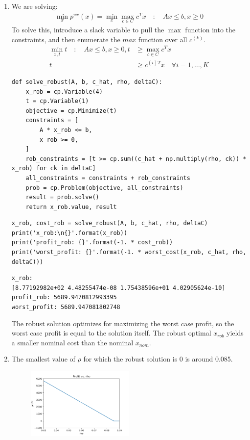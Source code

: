 \documentclass[11pt]{article}
\begin{document}
\begin{solution}
\begin{enumerate}
    \item We are solving:
    \begin{align*}
        \min_x p^{wc}(x) = \min_x \max_{c \in C} c^T x \quad : \quad Ax \leq b, x \geq 0
    \end{align*}
    To solve this, introduce a slack variable to pull the $\max$ function into the constraints, and then enumerate the $max$ function over all $c^{(k)}$.
    \begin{align*}
        \min_{x, t} t \quad : \quad Ax \leq b, x \geq 0, t &\geq \max_{c \in C} c^T x \\
        t &\geq c^{(i)T} x \quad \forall i = 1, \dots, K
    \end{align*}
    \begin{verbatim}
def solve_robust(A, b, c_hat, rho, deltaC):
    x_rob = cp.Variable(4)
    t = cp.Variable(1)
    objective = cp.Minimize(t)
    constraints = [
        A * x_rob <= b,
        x_rob >= 0,
    ]
    rob_constraints = [t >= cp.sum((c_hat + np.multiply(rho, ck)) * x_rob) for ck in deltaC]
    all_constraints = constraints + rob_constraints
    prob = cp.Problem(objective, all_constraints)
    result = prob.solve()
    return x_rob.value, result
    \end{verbatim}
    \begin{verbatim}
x_rob, cost_rob = solve_robust(A, b, c_hat, rho, deltaC)
print('x_rob:\n{}'.format(x_rob))
print('profit_rob: {}'.format(-1. * cost_rob))
print('worst_profit: {}'.format(-1. * worst_cost(x_rob, c_hat, rho, deltaC)))
    \end{verbatim}
    \begin{verbatim}
x_rob:
[8.77192982e+02 4.48255474e-08 1.75438596e+01 4.02905624e-10]
profit_rob: 5689.9470812993395
worst_profit: 5689.947081802748
    \end{verbatim}
    The robust solution optimizes for maximizing the worst case profit, so the worst case profit is equal to the solution itself. The robust optimal $x_{rob}$ yields a smaller nominal cost than the nominal $x_{nom}$.

    \item
    The smallest value of $\rho$ for which the robust solution is 0 is around 0.085.
    \begin{figure}[H]
        \centerline{\includegraphics[width=0.5\textwidth]{problem5_profit_vs_rho.png}}
    \end{figure}
\end{enumerate}
\end{solution}
\end{document}
